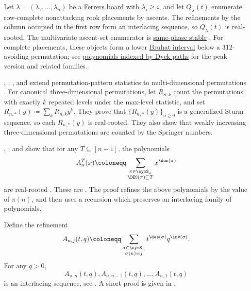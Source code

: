 \begin{example*}
Let $\lambda=(\lambda_1,\dotsc,\lambda_n)$ be a
\hyperref[rookPolynomial]{Ferrers board} with
$\lambda_i\geq i$, and let $Q_\lambda(t)$ enumerate row-complete nonattacking
rook placements by ascents.  The refinements by the column occupied in the
first row form an interlacing sequence, so $Q_\lambda(t)$ is real-rooted.  The
multivariate ascent-set enumerator is
\hyperref[samePhaseStable]{same-phase stable}
\cite[Thms.~12--13]{AlexanderssonJalQuemener2025x}.  For complete placements,
these objects form a lower \hyperref[bruhatOrder]{Bruhat interval} below a
$312$-avoiding permutation; see \hyperref[dyckPathBruhatPolynomials]{polynomials
indexed by Dyck paths} for the peak version and related families.
\end{example*}

\begin{example*}
, , , and
 extend permutation-pattern
statistics to multi-dimensional permutations \cite{ChenFangKitaevZhang2025}.
For canonical three-dimensional permutations, let $R_{n,k}$ count the
permutations with exactly $k$ repeated levels under the max-level statistic, and
set $R_{n,*}(y) \coloneqq \sum_k R_{n,k}y^k$.  They prove that
$\{R_{n,*}(y)\}_{n\geq 0}$ is a generalized Sturm sequence, so each
$R_{n,*}(y)$ is real-rooted.  They also show that weakly increasing
three-dimensional permutations are counted by the Springer numbers.
\end{example*}



\begin{example*}
, , and
 show that for any $T \subseteq [n-1]$,
the polynomials
\[
 A_n^T(x) \coloneqq  \sum_{\substack{\pi \in \symS_n \\ \DES(\pi) \subseteq T}} x^{\des(\pi)}
\]
are real-rooted
\cite[Thm.~1.2]{AthanasiadisDouvropoulosKalampogiaEvangelinou2024}.  These are
\label{restrictedEulerianPolynomial}.
The proof refines the above polynomials by the value of
$\pi(n)$, and then uses a recursion which preserves an interlacing family of
polynomials.
\end{example*}


\begin{example*}

Define the refinement
\[
  A_{n,j}(t,q)
  \coloneqq
  \sum_{\substack{\sigma \in \symS_n \\ \sigma(n)=j}}
  t^{\des(\sigma)}q^{\inv(\sigma)} .
\]
For any $q \gt 0$,
\[
 A_{n,n}(t,q), A_{n,n-1}(t,q), \dotsc, A_{n,1}(t,q)
\]
is an interlacing sequence, see \cite{SavageVisontai2015}.
A short proof is given in \cite{AthanasiadisEvangelinou2023x}.
\end{example*}


